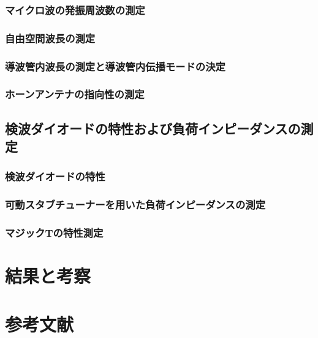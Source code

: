 \documentclass[11pt,a4j]{jarticle}
\begin{document}
   \subsubsection{マイクロ波の発振周波数の測定}
    
    
    
   \subsubsection{自由空間波長の測定}
    
    
    
   \subsubsection{導波管内波長の測定と導波管内伝播モードの決定}
    
    
    
   \subsubsection{ホーンアンテナの指向性の測定}
    
    
    
    
   
   
  \subsection{検波ダイオードの特性および負荷インピーダンスの測定}
   
   \subsubsection{検波ダイオードの特性}
    
    
    
   \subsubsection{可動スタブチューナーを用いた負荷インピーダンスの測定}
    
    
    
   \subsubsection{マジックTの特性測定}
    
    
    
 \section{結果と考察}
  
  
  
 \section{参考文献}
  
  
  
\end{document}
